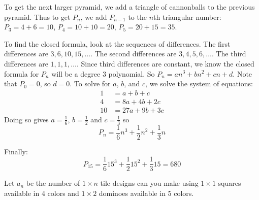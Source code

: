 \documentclass[10pt]{exam}
\begin{document}
\begin{questions}
\begin{solution}
  To get the next larger pyramid, we add a triangle of cannonballs to the previous pyramid.  Thus to get $P_n$, we add $P_{n-1}$ to the $n$th triangular number:
  $P_3 = 4 + 6 = 10$, $P_4 = 10 + 10 = 20$, $P_5 = 20 + 15 = 35$.

  	To find the closed formula, look at the sequences of differences.  The first differences are $3, 6, 10, 15, \ldots$.  The second differences are $3, 4, 5, 6, \ldots$.  The third differences are $1,1,1,\ldots$.  Since third differences are constant, we know the closed formula for $P_n$ will be a degree 3 polynomial.  So $P_n = an^3 + b n^2 + cn + d$.  Note that $P_0 = 0$, so $d = 0$.  To solve for $a$, $b$, and $c$, we solve the system of equations:
  \begin{align*}
    1 & = a + b + c \\
    4 & = 8a+ 4b + 2c \\
    10 & = 27a + 9b + 3c
  \end{align*}
  Doing so gives $a = \frac{1}{6}$, $b = \frac{1}{2}$ and $c = \frac{1}{3}$ so
  \[P_n = \frac{1}{6}n^3 + \frac{1}{2} n^2 + \frac{1}{3} n\]

Finally:
  \[P_{15} = \frac{1}{6}15^3 + \frac{1}{2} 15^2 + \frac{1}{3} 15 = 680\]
\end{solution}




\question Let $a_n$ be the number of  $1 \times n$ tile designs can you make using $1 \times 1$ squares available in 4 colors and $1 \times 2$ dominoes available in 5 colors.
\end{questions}
\end{document}
